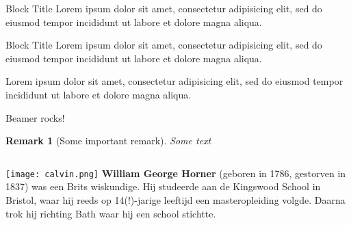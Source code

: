 \documentclass{beamer}
\newtheorem*{remark}{Remark}
\begin{document}

\begin{frame}
    \begin{block}{Block Title}
    Lorem ipsum dolor sit amet, consectetur adipisicing elit, sed do eiusmod tempor incididunt ut labore et dolore magna aliqua.
  \end{block}
  \begin{alertblock}{Block Title}
    Lorem ipsum dolor sit amet, consectetur adipisicing elit, sed do eiusmod tempor incididunt ut labore et dolore magna aliqua.
  \end{alertblock}
  \begin{example}
    Lorem ipsum dolor sit amet, consectetur adipisicing elit, sed do eiusmod tempor incididunt ut labore et dolore magna aliqua.
  \end{example}
\end{frame}


\begin{frame}
  \begin{theorem}
    Beamer rocks!
  \end{theorem}
  \begin{remark}[Some important remark]
    Some text
  \end{remark}
\end{frame}

\begin{frame}
    \begin{columns}
      \centering
      \texttt{[image: calvin.png]}
      \textbf{William George Horner} (geboren in 1786, gestorven in 1837) was een Brits
      wiskundige. Hij studeerde aan de Kingswood School in Bristol, waar hij reeds op
      14(!)-jarige leeftijd een masteropleiding volgde. Daarna trok hij richting Bath
      waar hij een school stichtte.
    \end{columns}
\end{frame}
\end{document}
